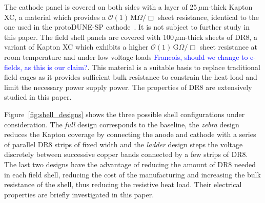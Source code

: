 \documentclass[a4paper,12pt]{article}
\newcommand{\DR}{DR8}
\newcommand{\RI}[1]{\textcolor{blue}{#1}}
\begin{document}

The cathode panel is covered on both sides with a layer of 25\,$\mu$m-thick Kapton XC, a material which provides a $\mathcal{O}(1)\,$M$\Omega/\Box$ sheet resistance, identical to the one used in the protoDUNE-SP cathode~\cite{protodune_sp_tdr}. It is not subject to further study in this paper. The field shell panels are covered with 100\,$\mu$m-thick sheets of {\DR}, a variant of Kapton XC which exhibits a higher $\mathcal{O}(1)\,$G$\Omega/\Box$ sheet resistance at room temperature and under low voltage loads \RI{ Francois, should we change to e-fields, as this is our claim?}. This material is a suitable basis to replace traditional field cages as it provides sufficient bulk resistance to constrain the heat load and limit the necessary power supply power. The properties of {\DR} are extensively studied in this paper.


Figure~\ref{fig:shell_designs} shows the three possible shell configurations under consideration. The \textit{full} design corresponds to the baseline, the \textit{zebra} design reduces the Kapton coverage by connecting the anode and cathode with a series of parallel {\DR} strips of fixed width and the \textit{ladder} design steps the voltage discretely between successive copper bands connected by a few strips of {\DR}. The last two designs have the advantage of reducing the amount of {\DR} needed in each field shell, reducing the cost of the manufacturing and increasing the bulk resistance of the shell, thus reducing the resistive heat load. Their electrical properties are briefly investigated in this paper.

\end{document}

